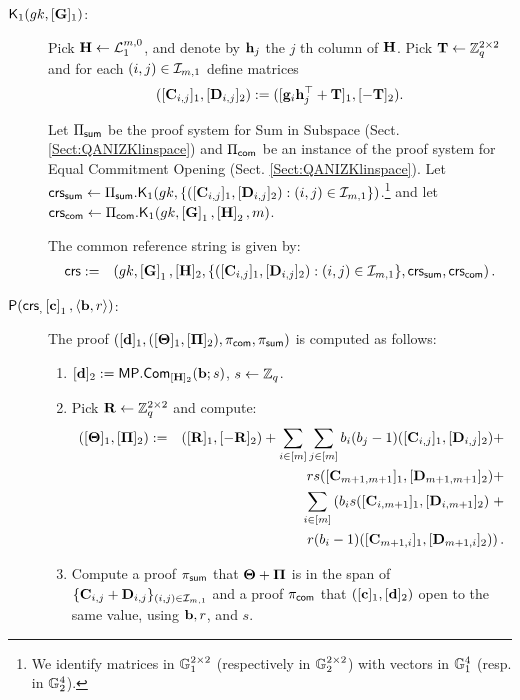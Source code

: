\begin{description}

\item[{$\mathsf{K}_1({gk}, [\mathbf{{G}}]_1)$}:] 
Pick $\mathbf{{H}}\gets\mathcal{L}_1^{m,0}$, and denote by $\mathbf{h}_{j}$ the $j$ th column of $\mathbf{{H}}$. Pick $\mathbf{{T}}\gets\mathbb{Z}_q^{2\times 2}$ and for each $(i,j)\in\mathcal{I}_{m,1}$ define matrices
$$([\mathbf{{C}}_{i,j}]_1,[\mathbf{{D}}_{i,j}]_2):=([\mathbf{g}_i\mathbf{h}_j^{\top}+\mathbf{{T}}]_1,[-\mathbf{{T}}]_2).$$

Let $\Pi_{\mathsf{sum}}$ be the proof system for Sum in Subspace 
(Sect. \ref{Sect:QANIZKlinspace}) and $\Pi_{\mathsf{com}}$
be an instance of the proof system for Equal Commitment Opening (Sect. \ref{Sect:QANIZKlinspace}).
Let
$\mathsf{crs}_{\mathsf{sum}} \gets \Pi_{\mathsf{sum}}.\mathsf{K}_1({gk}, \{([\mathbf{{C}}_{i,j}]_1,[\mathbf{{D}}_{i,j}]_2):(i,j)\in\mathcal{I}_{m,1}\})$.\footnote{We identify
matrices in $\mathbb{G}_1^{2 \times 2}$ (respectively in $\mathbb{G}_2^{2 \times 2}$) with vectors in $\mathbb{G}_1^{4}$ (resp. in $\mathbb{G}_2^{4}$).} and let $\mathsf{crs}_{\mathsf{com}} \gets \Pi_{\mathsf{com}}.\mathsf{K}_1({gk}, \left[\mathbf{{G}}\right]_1,\left[\mathbf{{H}}\right]_2,m)$. 

The common reference string is given by:
\begin{eqnarray*}
\mathsf{crs}&:=&\left( gk, \left[\mathbf{{G}}\right]_1,
    [\mathbf{{H}}]_2, \{([\mathbf{{C}}_{i,j}]_1, [\mathbf{{D}}_{i,j}]_2): (i,j) \in \mathcal{I}_{m,1}\},\mathsf{crs}_{\mathsf{sum}},\mathsf{crs}_{\mathsf{com}} \right).
 \end{eqnarray*}
\item[$\mathsf{P}(\mathsf{crs}_, \left[\mathbf{c}\right]_1, \langle \mathbf{b}, r \rangle)$:] The proof $([\mathbf{d}]_1,([\mathbf{{\Theta}}]_1,[\mathbf{{\Pi}}]_2),\pi_{\mathsf{com}},\pi_{\mathsf{sum}})$ is computed as follows:
\begin{enumerate}
\item $[\mathbf{d}]_2:= \mathsf{MP}.\mathsf{Com}_{[\mathbf{{H}}]_2} (\mathbf{b};s)$, $s \gets \mathbb{Z}_q$. 
\item Pick $\mathbf{{R}} \gets \mathbb{Z}_q^{2\times 2}$ and compute:
\begin{eqnarray*}
([\mathbf{{\Theta}}]_1, [\mathbf{{\Pi}}]_2) & := & ([\mathbf{{R}}]_1,[-\mathbf{{R}}]_2)+
\sum_{i\in[m]}\sum_{j\in[m]}b_i(b_j-1)([\mathbf{{C}}_{i,j}]_1,[\mathbf{{D}}_{i,j}]_2)+\\
& &     rs([\mathbf{{C}}_{m+1,m+1}]_1,[\mathbf{{D}}_{m+1,m+1}]_2)+\\
& &  \sum_{i \in [m]}
 \left(b_i s  ([\mathbf{{C}}_{i,m+1}]_1,[\mathbf{{D}}_{i,m+1}]_2)\right. +\\
& & \left.r(b_i-1) ([\mathbf{{C}}_{m+1,i}]_1,[\mathbf{{D}}_{m+1,i}]_2)\right).
\end{eqnarray*}
\item Compute a proof $\pi_{\mathsf{sum}}$
that $\mathbf{{\Theta}}+\mathbf{{\Pi}}$ is in the span of 
$\{\mathbf{{C}}_{i,j}+\mathbf{{D}}_{i,j}\}_{(i,j)\in\mathcal{I}_{m,1}}$
and a proof $\pi_{\mathsf{com}}$
that
$([\mathbf{c}]_1,[\mathbf{d}]_2)$ open to the same value,
using $\mathbf{b},r$, and $s$. \\
\end{enumerate}


\end{description}
